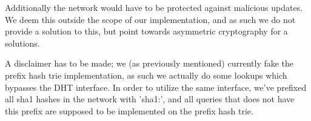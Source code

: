 Additionally the network would have to be protected against malicious updates.
We deem this outside the scope of our implementation, and as such we do not
provide a solution to this, but point towards asymmetric cryptography for a 
solutions.

A disclaimer has to be made; we (as previously mentioned) currently fake the 
prefix hash trie implementation, as such we actually do some lookups which
bypasses the \acs{DHT} interface. In order to utilize the same interface, we've
prefixed all sha1 hashes in the network with 'sha1:', and all queries that does
not have this prefix are supposed to be implemented on the prefix hash trie.
